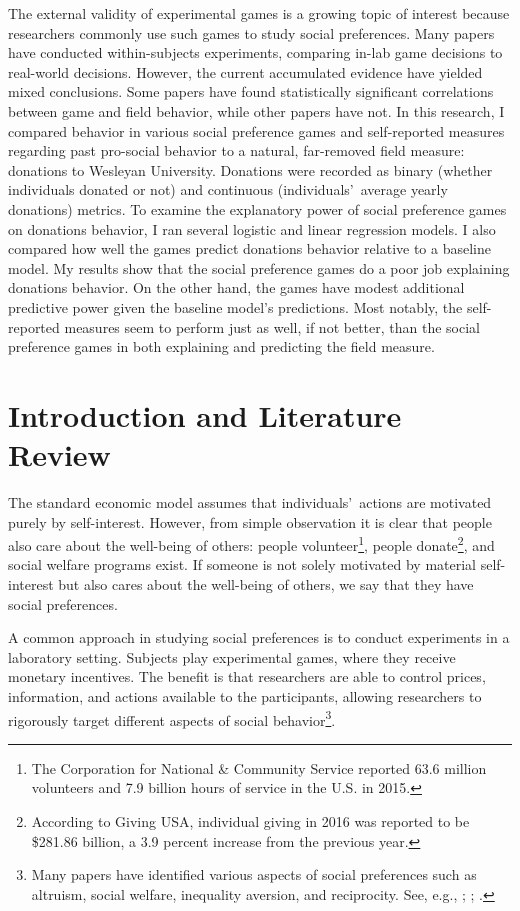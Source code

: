 \documentclass[12pt]{article}
\begin{document}
The external validity of experimental games is a growing topic of interest because researchers commonly use such games to study social preferences. Many papers have conducted within-subjects experiments, comparing in-lab game decisions to real-world decisions. However, the current accumulated evidence have yielded mixed conclusions. Some papers have found statistically significant correlations between game and field behavior, while other papers have not. In this research, I compared behavior in various social preference games and self-reported measures regarding past pro-social behavior to a natural, far-removed field measure: donations to Wesleyan University. Donations were recorded as binary (whether individuals donated or not) and continuous (individuals\rq \ average yearly donations) metrics. To examine the explanatory power of social preference games on donations behavior, I ran several logistic and linear regression models. I also compared how well the games predict donations behavior relative to a baseline model. My results show that the social preference games do a poor job explaining donations behavior. On the other hand, the games have modest additional predictive power given the baseline model\rq s predictions. Most notably, the self-reported measures seem to perform just as well, if not better, than the social preference games in both explaining and predicting the field measure. 



\newpage


\doublespacing
\section{Introduction and Literature Review}

The standard economic model assumes that individuals\rq \ actions are motivated purely by self-interest. However, from simple observation it is clear that people also care about the well-being of others: people volunteer\footnote{The Corporation for National \& Community Service reported 63.6 million volunteers and 7.9 billion hours of service in the U.S. in 2015.}, people donate\footnote{According to Giving USA, individual giving in 2016 was reported to be \$281.86 billion, a 3.9 percent increase from the previous year.}, and social welfare programs exist. If someone is not solely motivated by material self-interest but also cares about the well-being of others, we say that they have social preferences. 

A common approach in studying social preferences is to conduct experiments in a laboratory setting. Subjects play experimental games, where they receive monetary incentives. The benefit is that researchers are able to control prices, information, and actions available to the participants, allowing researchers to rigorously target different aspects of social behavior\footnote{Many papers have identified various aspects of social preferences such as altruism, social welfare, inequality aversion, and reciprocity. See, e.g., \cite{charness_rabin_2002}; \cite{rabin_1993}; \cite{fisman_jakiela_kariv_2014}.}.
\end{document}
